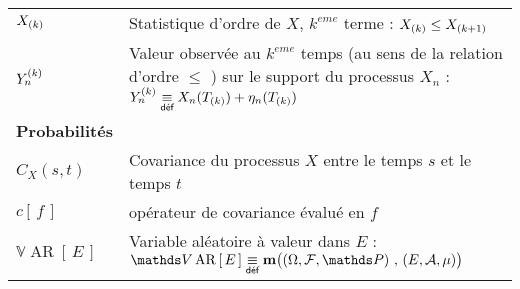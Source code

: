 \begin{table}[H]
\begin{tabularx}{\textwidth}{lX}
		$\ordered X k$                                                   & Statistique d'ordre de $X$, $k^{eme}$ terme : $\ordered X {k} \leq \ordered X {k+1}$                                                                                                                                              \\
		$\statrang Y n {k}$                                              & Valeur observée au $k^{eme}$ temps (au sens de la relation d'ordre $\leq$ ) sur le support du processus $X_n$ : $\statrang Y n k \isdef X_n( \ordered T k ) + \eta_n( \ordered T k )$                                             \\
		\midrule
		\textbf{Probabilités}                                            &                                                                                                                                                                                                                                   \\
		\midrule
		$C_X (s,t)$                                                      & Covariance du processus $X$ entre le temps $s$ et le temps $t$                                                                                                                                                                    \\
		$c\left[ \, f \, \right]$                                        & opérateur de covariance évalué en $f$                                                                                                                                                                                             \\
		$\mathds V \operatorname{AR}\left[ \, E \,\right]$               & Variable aléatoire à valeur dans $E$ : $\mathds V \operatorname{AR}\left[ \, E \,\right] \isdef \mathbf m\bigl( \left(\Omega, \mathcal F, \mathds P\right) \, , \, \left(E, \mathcal A, \mu\right) \bigr)$                        \\
		\bottomrule
	\end{tabularx}
\end{table}



